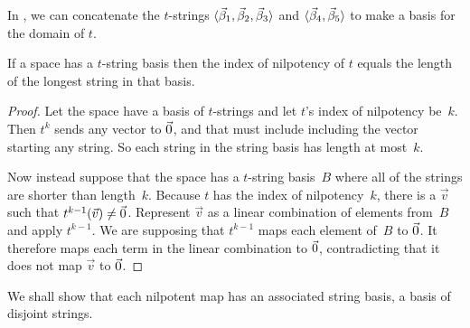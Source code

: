 \begin{example}
In , we can concatenate the $t$-strings
$\langle\vec{\beta}_1,\vec{\beta}_2,\vec{\beta}_3\rangle$ and
$\langle\vec{\beta}_4,\vec{\beta}_5\rangle$
to make a basis for the domain of $t$.
\end{example}

\begin{lemma}  \label{le:LongestTowerIsIndex}
If a space has a \( t \)-string basis then the index of nilpotency of $t$
equals the length of the longest string in that basis.
\end{lemma}

\begin{proof}
Let the space have a basis of $t$-strings and let $t$'s index of
nilpotency be~$k$.
Then \( t^k \) sends any vector to \( \vec{0} \), and that must include 
including the vector starting any string. 
So each string in the string basis has length at most~$k$.

Now instead suppose that the space has a $t$-string basis~$B$ where 
all of the strings are shorter than length~\( k \).
Because $t$ has the index of nilpotency~$k$, there is a \( \vec{v} \) 
such that \( t^{k-1}(\vec{v})\neq\vec{0} \).
Represent $\vec{v}$ as a linear combination of elements from~$B$ 
and apply \( t^{k-1} \).
We are supposing that \( t^{k-1} \) maps each element of~$B$ to \( \vec{0} \).
It therefore maps each term in the linear combination to $\vec{0}$,
contradicting that it does not map \( \vec{v} \) to \( \vec{0} \).
\end{proof}

We shall show that each
nilpotent map has an associated string basis, a basis of disjoint strings.

